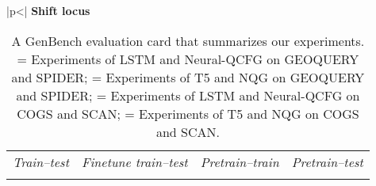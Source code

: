 \begin{table}[]
\begin{tabular}{|p{\tabularwidth}<{\centering}|}
\textbf{Shift locus}\\             
\footnotesize
\begin{tabular}{p{0.25\tabularwidth}<{\centering} p{0.25\tabularwidth}<{\centering} p{0.25\tabularwidth}<{\centering} p{0.25\tabularwidth}<{\centering}}                         
\textit{Train--test} & \textit{Finetune train--test} & \textit{Pretrain--train} & \textit{Pretrain--test}\\
\expone\hspace{0.8mm}\expthree\hspace{0.8mm}		%
& \exptwo\hspace{0.8mm}\expfour\hspace{0.8mm}		%
& 		%
& 		%

\vspace{2mm} \\
\end{tabular} \\
\hline

\end{tabular}
\caption{A GenBench evaluation card \citep{hupkes2022sotageneralisation} that summarizes our experiments. \expone = Experiments of LSTM and Neural-QCFG on GEOQUERY and SPIDER; \exptwo = Experiments of T5 and NQG on GEOQUERY and SPIDER; \expthree = Experiments of LSTM and Neural-QCFG on COGS and SCAN; \expfour = Experiments of T5 and NQG on COGS and SCAN.}
\label{tab:eval_card}
\end{table}